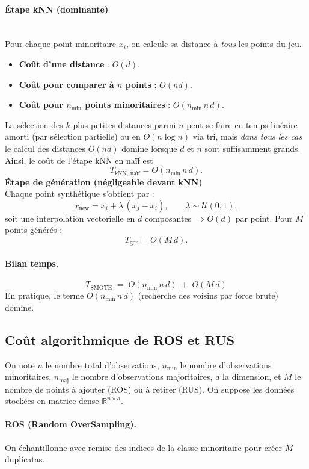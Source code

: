 \documentclass{article}
\begin{document}
\paragraph{Étape kNN (dominante)} \cite{sklearnNeighbors}
\\
Pour chaque point minoritaire $x_i$, on calcule sa distance à \emph{tous} les points du jeu.
\begin{itemize}
  \item \textbf{Coût d'une distance} : $O(d)$.
  \item \textbf{Coût pour comparer à $n$ points} : $O(nd)$.
  \item \textbf{Coût pour $n_{\text{min}}$ points minoritaires} : $O(n_{\text{min}}\,n\,d)$.
\end{itemize}
La sélection des $k$ plus petites distances parmi $n$ peut se faire en temps linéaire amorti
(par sélection partielle) ou en $O(n\log n)$ via tri, mais \emph{dans tous les cas} le calcul des distances
$O(nd)$ domine lorsque $d$ et $n$ sont suffisamment grands. Ainsi, le coût de l’étape kNN en naïf est
\[
T_{\text{kNN, naïf}} = O(n_{\text{min}}\,n\,d).
\]
\vspace{0.5cm}
\textbf{Étape de génération (négligeable devant kNN)}
\\
Chaque point synthétique s’obtient par :
\[
x_{\text{new}} = x_i + \lambda\,(x_j - x_i), \qquad \lambda\sim\mathcal{U}(0,1),
\]
soit une interpolation vectorielle en $d$ composantes $\Rightarrow O(d)$ par point.
Pour $M$ points générés :
\[
T_{\text{gen}} = O(M\,d).
\]

\paragraph{Bilan temps.}
\[
\boxed{ \; T_{\text{SMOTE}} \;=\; O(n_{\text{min}}\,n\,d) \;+\; O(M\,d) \;}
\]
En pratique, le terme $O(n_{\text{min}}\,n\,d)$ (recherche des voisins par force brute) domine.
\subsection{Coût algorithmique de ROS et RUS}

On note $n$ le nombre total d'observations, $n_{\min}$ le nombre d'observations minoritaires,
$n_{\text{maj}}$ le nombre d'observations majoritaires, $d$ la dimension, et $M$ le nombre de points à
ajouter (ROS) ou à retirer (RUS). On suppose les données stockées en matrice dense $\mathbb{R}^{n\times d}$.

\paragraph{ROS (Random OverSampling).}
On échantillonne avec remise des indices de la classe minoritaire pour créer $M$ duplicatas.
\end{document}
